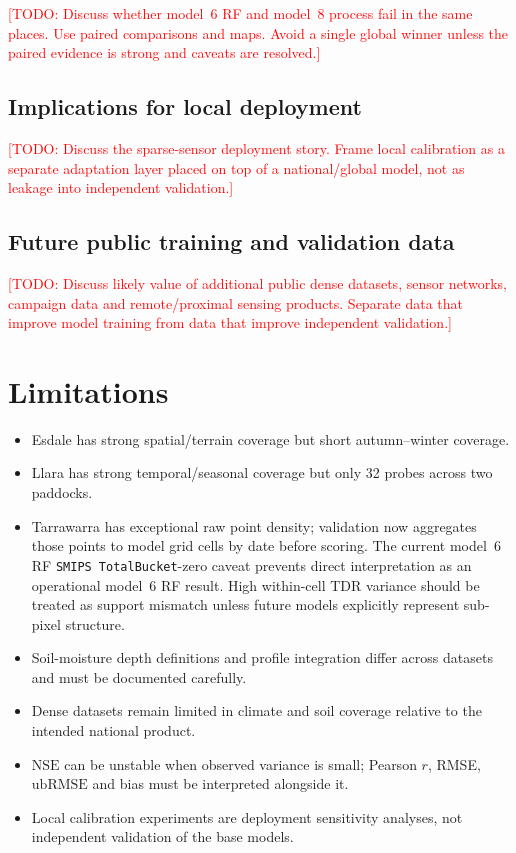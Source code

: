 \documentclass[11pt,a4paper]{article}
\newcommand{\nse}{\ensuremath{\mathrm{NSE}}}
\newcommand{\ubrmse}{\ensuremath{\mathrm{ubRMSE}}}
\newcommand{\pearsonr}{\ensuremath{r}}
\newcommand{\modelSix}{model~6 RF}
\newcommand{\modelEight}{model~8 process}
\newcommand{\smips}{\texttt{SMIPS TotalBucket}}
\newcommand{\todo}[1]{\textcolor{red}{[TODO: #1]}}
\begin{document}
\todo{Discuss whether \modelSix{} and \modelEight{} fail in the same places.
Use paired comparisons and maps.  Avoid a single global winner unless the
paired evidence is strong and caveats are resolved.}

\subsection{Implications for local deployment}
\label{sec:deployment}

\todo{Discuss the sparse-sensor deployment story.  Frame local calibration as a
separate adaptation layer placed on top of a national/global model, not as
leakage into independent validation.}

\subsection{Future public training and validation data}
\label{sec:future-data}

\todo{Discuss likely value of additional public dense datasets, sensor
networks, campaign data and remote/proximal sensing products.  Separate data
that improve model training from data that improve independent validation.}

\section{Limitations}\label{sec:limitations}

\begin{itemize}
\item Esdale has strong spatial/terrain coverage but short autumn--winter
coverage.
\item Llara has strong temporal/seasonal coverage but only 32 probes across
two paddocks.
\item Tarrawarra has exceptional raw point density; validation now aggregates
those points to model grid cells by date before scoring. The current
\modelSix{} \smips{}-zero caveat prevents direct interpretation as an
operational \modelSix{} result. High within-cell TDR variance should be treated
as support mismatch unless future models explicitly represent sub-pixel
structure.
\item Soil-moisture depth definitions and profile integration differ across
datasets and must be documented carefully.
\item Dense datasets remain limited in climate and soil coverage relative to
the intended national product.
\item \nse{} can be unstable when observed variance is small; Pearson
$\pearsonr$, RMSE, \ubrmse{} and bias must be interpreted alongside it.
\item Local calibration experiments are deployment sensitivity analyses, not
independent validation of the base models.
\end{itemize}
\end{document}
